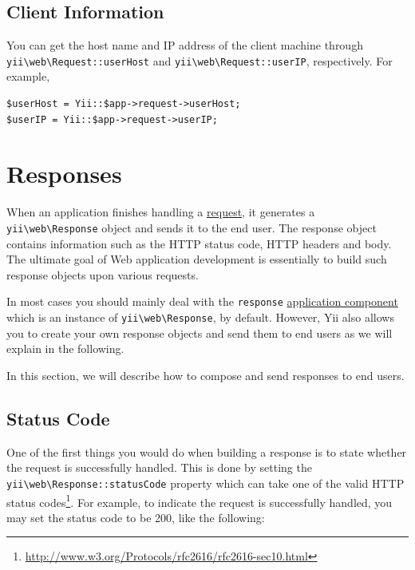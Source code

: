\subsection{Client Information \label{runtime-requests.md::client-information}}
You can get the host name and IP address of the client machine through \texttt{yii{\allowbreak{}\textbackslash}web{\allowbreak{}\textbackslash}Request\allowbreak{}::\allowbreak{}userHost}
and \texttt{yii{\allowbreak{}\textbackslash}web{\allowbreak{}\textbackslash}Request\allowbreak{}::\allowbreak{}userIP}, respectively. For example,

\lstset{language=php}\begin{lstlisting}
$userHost = Yii::$app->request->userHost;
$userIP = Yii::$app->request->userIP;
\end{lstlisting}


\label{runtime-responses.md}\section{Responses}
When an application finishes handling a \hyperref[runtime-requests.md]{request}, it generates a \texttt{yii{\allowbreak{}\textbackslash}web{\allowbreak{}\textbackslash}Response} object
and sends it to the end user. The response object contains information such as the HTTP status code, HTTP headers and body.
The ultimate goal of Web application development is essentially to build such response objects upon various requests.

In most cases you should mainly deal with the \lstinline|response| \hyperref[structure-application-components.md]{application component}
which is an instance of \texttt{yii{\allowbreak{}\textbackslash}web{\allowbreak{}\textbackslash}Response}, by default. However, Yii also allows you to create your own response
objects and send them to end users as we will explain in the following.

In this section, we will describe how to compose and send responses to end users. 

\subsection{Status Code \label{runtime-responses.md::status-code}}
One of the first things you would do when building a response is to state whether the request is successfully handled.
This is done by setting the \texttt{yii{\allowbreak{}\textbackslash}web{\allowbreak{}\textbackslash}Response\allowbreak{}::\allowbreak{}statusCode} property which can take one of the valid
HTTP status codes\footnote{\url{http://www.w3.org/Protocols/rfc2616/rfc2616-sec10.html}}. For example, to indicate the request
is successfully handled, you may set the status code to be 200, like the following:

